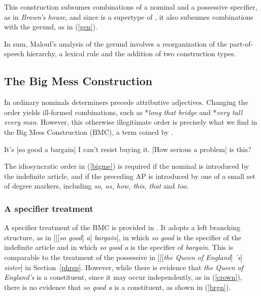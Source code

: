 \documentclass[output=paper
                ,modfonts
                ,nonflat
	        ,collection
	        ,collectionchapter
	        ,collectiontoclongg
 	        ,biblatex
                ,babelshorthands
                ,newtxmath
                ,draftmode
                ,colorlinks, citecolor=brown
]{./langsci/langscibook}
\begin{document}
\noindent
This construction subsumes combinations of a nominal and a 
possessive specifier, as in \emph{Brown's house}, and since 
 is a supertype of ,  
it also subsumes combinations with the gerund, as in (\ref{gen}). 

In sum, Malouf's analysis of the gerund involves a reorganization of the 
part-of-speech hierarchy, a lexical rule and the addition of two construction types.     



\subsection{The Big Mess Construction} 
\label{bime}  


In ordinary nominals determiners precede attributive adjectives. Changing the order 
yields ill-formed combinations, such as *\emph{long that bridge} and *\emph{very tall every man}. 
However, this otherwise illegitimate order is precisely what we find in 
the Big Mess Construction (BMC), a term coined by \citet{Berman74}.  

\begin{exe}
\ex\label{bigme}
\begin{xlist}
\ex   It's [so good a bargain] I can't resist buying it.
\ex   {}[How serious a problem] is this?
\end{xlist}
\end{exe} 

\noindent
The idiosyncratic order in (\ref{bigme}) is required if the nominal is introduced 
by the indefinite article, and if the preceding AP is introduced by one of a small 
set of degree markers, including \emph{so, as, how, this, that} and \emph{too}. 


\subsubsection{A specifier treatment} 


A specifier treatment of the BMC is provided in \citet[201]{GS00}. It adopts  
a left branching structure, as in [[[\emph{so good}] \emph{a}] \emph{bargain}], 
in which \emph{so good} is the specifier of the indefinite article and in which 
\emph{so good a} is the specifier of \emph{bargain}. 
This is comparable to the treatment of the possessive in 
[[[\emph{the Queen of England}] \emph{'s}] \emph{sister}] in Section~\ref{phrsp}.  
However, while there is evidence that \emph{the Queen of England's} is a constituent,
since it may occur independently, as in (\ref{crown}), there is no evidence that 
\emph{so good a} is a constituent, as shown in (\ref{brgn}).
\end{document}
